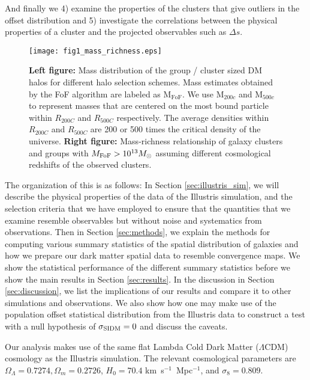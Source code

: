 And finally we 
4) examine the properties of the clusters that give outliers in 
the offset distribution and 5) investigate the  
correlations between the physical properties of a cluster and the projected 
observables such as $\Delta s$. 
\begin{figure*}
	\texttt{[image: fig1\_mass\_richness.eps]}
	\caption{ {\bf Left figure:} Mass distribution of the group / cluster sized 
		DM halos for different halo selection schemes. Mass estimates obtained by the
		FoF algorithm are labeled as  M$_{\text{FoF}}$.
		We use M$_{200c}$ and M$_{500c}$ to represent 
		masses that are centered on the most bound particle within $R_{200C}$ and
		$R_{500C}$ respectively. The  
		average densities within $R_{200C}$ and $R_{500C}$ are 
		200 or 500 times the critical density of the universe. 
		{\bf Right figure:} 
		Mass-richness relationship of galaxy clusters and groups with 
		$M_{\rm FoF} > 10^{13} M_{\odot}$ assuming different cosmological redshifts
		of the observed clusters. 
\label{fig:mass_richness}}
\end{figure*}

The organization of this  is as follows:
In Section \ref{sec:illustris_sim}, we will describe the physical properties of 
the data of the Illustris
simulation, 
and the selection criteria that we have employed to ensure that the
quantities that we examine resemble observables but without noise and
systematics from observations. 
Then in Section \ref{sec:methods}, 
we explain the methods for computing various 
summary statistics of the spatial distribution of galaxies and how we prepare our dark
matter spatial data to resemble convergence maps. We show the statistical performance
of the different summary statistics before we show the main results
in Section \ref{sec:results}. In the discussion in Section \ref{sec:discussion}, 
we list the implications of our
results and compare it to other simulations and observations. We also 
show how one may make use of the population offset statistical distribution
from the Illustris data to construct a test with 
a null hypothesis of $\sigma_{\rm SIDM} = 0$ and discuss the caveats. 

	Our analysis makes use of the same flat Lambda Cold Dark Matter ($\Lambda$CDM) cosmology
as the Illustris simulation. The relevant cosmological parameters are
$\Omega_\Lambda = 0.7274, \Omega_m = 0.2726$, $H_0 = 70.4$
km~s$^{-1}$~Mpc$^{-1}$, and $\sigma_8 = 0.809$.

